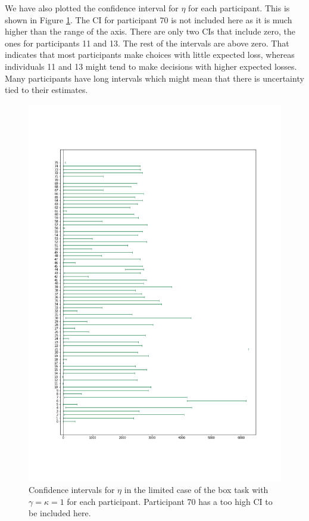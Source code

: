We have also plotted the confidence interval for $\eta$ for each participant. This is shown in Figure \ref{fig:all_cis_eta_lim}. The CI for participant 70 is not included here as it is much higher than the range of the axis. There are only two CIs that include zero, the ones for participants 11 and 13. The rest of the intervals are above zero. That indicates that most participants make  choices with little expected loss, whereas individuals 11 and 13 might tend to make decisions with higher expected losses. Many participants have long intervals which might mean that there is uncertainty tied to their estimates. 
\begin{figure}
    \centering
    \includegraphics[scale=0.37]{pictures/all_cis_lim_eta.png}
    \caption[CIs for $\eta$, limited. $\gamma=\kappa=1$]{Confidence intervals for $\eta$ in the limited case of the box task with $\gamma=\kappa=1$ for each participant. Participant 70 has a too high CI to be included here.}
    \label{fig:all_cis_eta_lim}
\end{figure}


